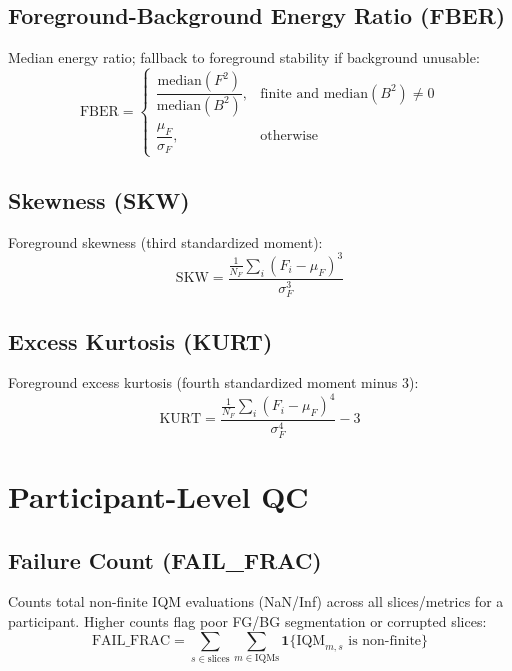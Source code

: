 \documentclass[11pt]{article}
\begin{document}
\subsection{Foreground-Background Energy Ratio (FBER)}
Median energy ratio; fallback to foreground stability if background unusable:
\[
\text{FBER} =
\begin{cases}
\dfrac{\text{median}(F^2)}{\text{median}(B^2)}, & \text{finite and } \text{median}(B^2)\neq 0\\[6pt]
\dfrac{\mu_F}{\sigma_F}, & \text{otherwise}
\end{cases}
\]

\subsection{Skewness (SKW)}
Foreground skewness (third standardized moment):
\[
\text{SKW} = \frac{\frac{1}{N_F}\sum_i (F_i - \mu_F)^3}{\sigma_F^3}
\]

\subsection{Excess Kurtosis (KURT)}
Foreground excess kurtosis (fourth standardized moment minus 3):
\[
\text{KURT} = \frac{\frac{1}{N_F}\sum_i (F_i - \mu_F)^4}{\sigma_F^4} - 3
\]

\section{Participant-Level QC}
\subsection{Failure Count (FAIL\_FRAC)}
Counts total non-finite IQM evaluations (NaN/Inf) across all slices/metrics for a participant. Higher counts flag poor FG/BG segmentation or corrupted slices:
\[
\text{FAIL\_FRAC} = \sum_{s \in \text{slices}} \sum_{m \in \text{IQMs}} \mathbf{1}\{\text{IQM}_{m,s} \text{ is non-finite}\}
\]




\printbibliography[heading=bibintoc,title={References}]
\end{document}
